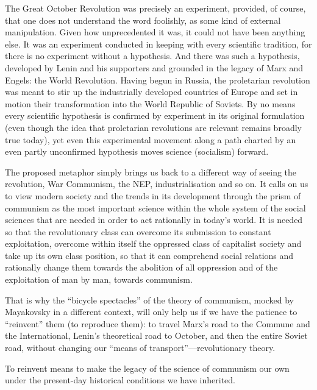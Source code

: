 \documentclass[../main]{subfiles}
\begin{document}
The Great October Revolution was precisely an experiment, provided, of course, that one does not understand the word foolishly, as some kind of external manipulation. Given how unprecedented it was, it could not have been anything else. It was an experiment conducted in keeping with every scientific tradition, for there is no experiment without a hypothesis. And there was such a hypothesis, developed by Lenin and his supporters and grounded in the legacy of Marx and Engels: the World Revolution. Having begun in Russia, the proletarian revolution was meant to stir up the industrially developed countries of Europe and set in motion their transformation into the World Republic of Soviets. By no means every scientific hypothesis is confirmed by experiment in its original formulation (even though the idea that proletarian revolutions are relevant remains broadly true today), yet even this experimental movement along a path charted by an even partly unconfirmed hypothesis moves science (socialism) forward.

The proposed metaphor simply brings us back to a different way of seeing the revolution, War Communism, the NEP, industrialisation and so on. It calls on us to view modern society and the trends in its development through the prism of communism as the most important science within the whole system of the social sciences that are needed in order to act rationally in today’s world. It is needed so that the revolutionary class can overcome its submission to constant exploitation, overcome within itself the oppressed class of capitalist society and take up its own class position, so that it can comprehend social relations and rationally change them towards the abolition of all oppression and of the exploitation of man by man, towards communism.

That is why the “bicycle spectacles” of the theory of communism, mocked by Mayakovsky in a different context, will only help us if we have the patience to “reinvent” them (to reproduce them): to travel Marx’s road to the Commune and the International, Lenin’s theoretical road to October, and then the entire Soviet road, without changing our “means of transport”—revolutionary theory.

To reinvent means to make the legacy of the science of communism our own under the present-day historical conditions we have inherited.
\end{document}
